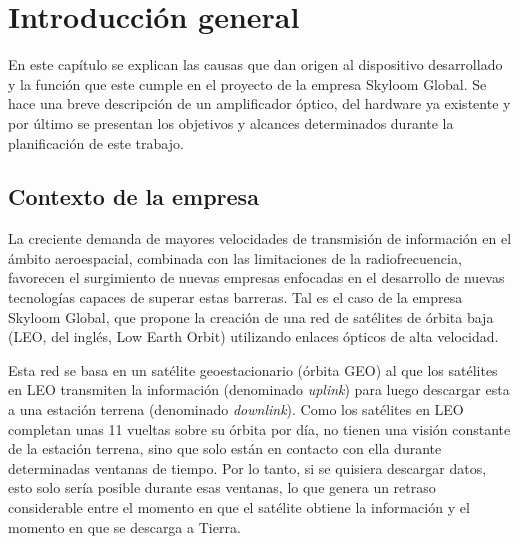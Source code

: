 
\chapter{Introducción general} %

\label{Chapter1} %
\label{IntroGeneral}


\newcommand{\keyword}[1]{\textbf{#1}}
\newcommand{\tabhead}[1]{\textbf{#1}}
\newcommand{\code}[1]{\texttt{#1}}
\newcommand{\file}[1]{\texttt{\bfseries#1}}
\newcommand{\option}[1]{\texttt{\itshape#1}}
\newcommand{\grados}{$^{\circ}$}


En este capítulo se explican las causas que dan origen al dispositivo desarrollado y la función que este cumple en el proyecto de la empresa Skyloom Global. Se hace una breve descripción de un amplificador óptico, del hardware ya existente y por último se presentan los objetivos y alcances determinados durante la planificación de este trabajo.


\section{Contexto de la empresa}
\label{sec:contexto}

La creciente demanda de mayores velocidades de transmisión de información en el ámbito aeroespacial, combinada con las limitaciones de la radiofrecuencia, favorecen el surgimiento de nuevas empresas enfocadas en el desarrollo de nuevas tecnologías capaces de superar estas barreras. Tal es el caso de la empresa Skyloom Global, que propone la creación de una red de satélites de órbita baja (LEO, del inglés, Low Earth Orbit) \citep{WEBSITE:LEO} utilizando enlaces ópticos de alta velocidad.

Esta red se basa en un satélite geoestacionario (órbita GEO) \citep{WEBSITE:GEO} al que los satélites en LEO transmiten la información (denominado \textit{uplink}) para luego descargar esta a una estación terrena (denominado \textit{downlink}). Como los satélites en LEO completan unas 11 vueltas sobre su órbita por día, no tienen una visión constante de la estación terrena, sino que solo están en contacto con ella durante determinadas ventanas de tiempo. Por lo tanto, si se quisiera descargar datos, esto solo sería posible durante esas ventanas, lo que genera un retraso considerable entre el momento en que el satélite obtiene la información y el momento en que se descarga a Tierra. 

